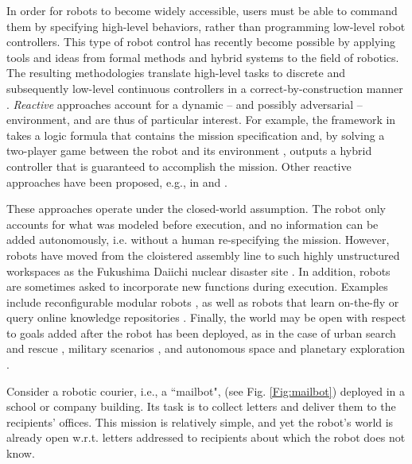 In order for robots to become widely accessible, users must be able to command them by specifying high-level behaviors, rather than programming low-level robot controllers.
This type of robot control has recently become possible by applying tools and ideas from formal methods and hybrid systems to the field of robotics. The resulting methodologies translate high-level tasks to discrete and subsequently low-level continuous controllers in a correct-by-construction manner \cite{BBEFKP06, KGFP_TRO09, KaramanCDC2009, Wongpiromsarn2010, LaValleRSS2011, BhatiaRAM2011, Belta2013RSS}.
\emph{Reactive} approaches account for a dynamic -- and possibly adversarial -- environment, and are thus of particular interest. For example, the framework in \cite{KGFP_TRO09} takes a logic formula that contains the mission specification and, by solving a two-player game between the robot and its environment \cite{piterman_06}, outputs a hybrid controller that is guaranteed to accomplish the mission. Other reactive approaches have been proposed, e.g., in \cite{Wongpiromsarn2010} and \cite{Belta2013RSS}.

These approaches operate under the closed-world assumption. The robot only accounts for what was modeled before execution, and no information can be added autonomously, i.e. without a human re-specifying the mission.
However, robots have moved from the cloistered assembly line to such highly unstructured workspaces as the Fukushima Daiichi nuclear disaster site \cite{Fukushima2011}. 
In addition, robots are sometimes asked to incorporate new functions during execution. 
Examples include reconfigurable modular robots \cite{ModularIROS2011}, as well as robots that learn on-the-fly \cite{SaxenaIJRR2012} or query online knowledge repositories \cite{rapyuta2013}. 
Finally, the world may be open with respect to goals added after the robot has been deployed, as in the case of urban search and rescue \cite{MatthiasAI2010}, military scenarios \cite{gda2013}, and autonomous space and planetary exploration \cite{spaceXplore2006}. 

\begin{myExample}\label{Ex:mailbot1}
Consider a robotic courier, i.e., a ``mailbot", (see Fig. \ref{Fig:mailbot}) deployed in a school or company building. 
Its task is to collect letters and deliver them to the recipients' offices. 
This mission is relatively simple, and yet the robot's world is already open w.r.t. letters addressed to recipients about which the robot does not know. %
\end{myExample}

